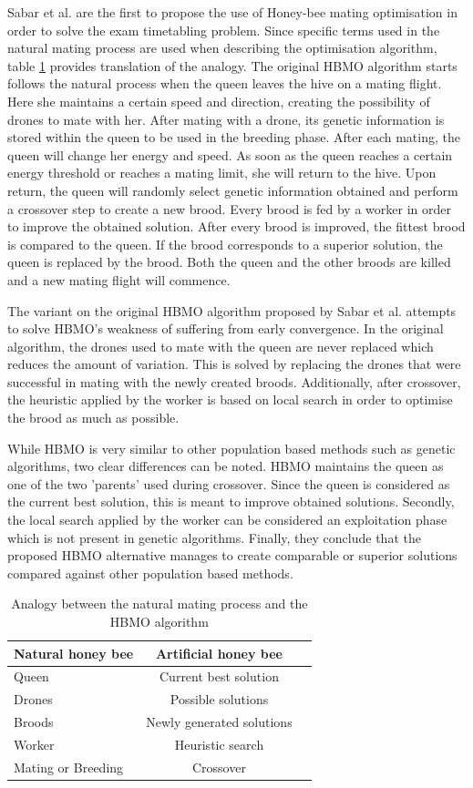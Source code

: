 Sabar et al. \cite{Sabar2009} are the first to propose the use of Honey-bee mating optimisation in order to solve the exam timetabling problem. Since specific terms used in the natural mating process are used when describing the optimisation algorithm, table \ref{tab:hbmo} provides translation of the analogy. The original HBMO algorithm starts follows the natural process when the queen leaves the hive on a mating flight. Here she maintains a certain speed and direction, creating the possibility of drones to mate with her. After mating with a drone, its genetic information is stored within the queen to be used in the breeding phase. After each mating, the queen will change her energy and speed. As soon as the queen reaches a certain energy threshold or reaches a mating limit, she will return to the hive. Upon return, the queen will randomly select genetic information obtained and perform a crossover step to create a new brood. Every brood is fed by a worker in order to improve the obtained solution. After every brood is improved, the fittest brood is compared to the queen. If the brood corresponds to a superior solution, the queen is replaced by the brood. Both the queen and the other broods are killed and a new mating flight will commence. 

The variant on the original HBMO algorithm proposed by Sabar et al. attempts to solve HBMO's weakness of suffering from early convergence. In the original algorithm, the drones used to mate with the queen are never replaced which reduces the amount of variation. This is solved by replacing the drones that were successful in mating with the newly created broods. Additionally, after crossover, the heuristic applied by the worker is based on local search in order to optimise the brood as much as possible.

While HBMO is very similar to other population based methods such as genetic algorithms, two clear differences can be noted. HBMO maintains the queen as one of the two 'parents' used during crossover. Since the queen is considered as the current best solution, this is meant to improve obtained solutions. Secondly, the local search applied by the worker can be considered an exploitation phase which is not present in genetic algorithms. Finally, they conclude that the proposed HBMO alternative manages to create comparable or superior solutions compared against other population based methods.

\begin{table}[h]
	\caption{Analogy between the natural mating process and the HBMO algorithm}
	\label{tab:hbmo}
	\centering
	\begin{tabular}{l c c }
		\hline
		\textbf{Natural honey bee}  & \textbf{Artificial honey bee} \\ \hline
		Queen & Current best solution \\
		Drones & Possible solutions \\
	    Broods & Newly generated solutions \\
            Worker & Heuristic search \\
            Mating or Breeding & Crossover \\ \hline
	\end{tabular}
\end{table}


